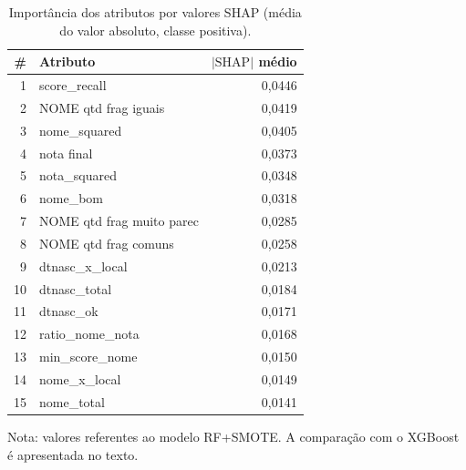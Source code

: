 \begin{table}[htbp]
\centering
\caption{Import\^ancia dos atributos por valores SHAP (m\'edia do valor absoluto, classe positiva).}
\label{tab:shap-importance}
\begin{tabular}{rlr}
\toprule
\# & Atributo & $|\mathrm{SHAP}|$ m\'edio \\
\midrule
1 & score\_recall & 0,0446 \\
2 & NOME qtd frag iguais & 0,0419 \\
3 & nome\_squared & 0,0405 \\
4 & nota final & 0,0373 \\
5 & nota\_squared & 0,0348 \\
6 & nome\_bom & 0,0318 \\
7 & NOME qtd frag muito parec & 0,0285 \\
8 & NOME qtd frag comuns & 0,0258 \\
9 & dtnasc\_x\_local & 0,0213 \\
10 & dtnasc\_total & 0,0184 \\
11 & dtnasc\_ok & 0,0171 \\
12 & ratio\_nome\_nota & 0,0168 \\
13 & min\_score\_nome & 0,0150 \\
14 & nome\_x\_local & 0,0149 \\
15 & nome\_total & 0,0141 \\
\bottomrule
\end{tabular}

\par\small Nota: valores referentes ao modelo RF+SMOTE. A compara\c{c}\~ao com o XGBoost \'e apresentada no texto.
\end{table}